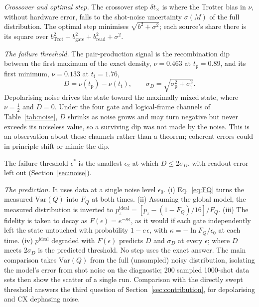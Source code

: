 \emph{Crossover and optimal step.} The crossover step $\delta t_\times$ is where
the Trotter bias in $\nu$, without hardware error, falls to the shot-noise
uncertainty $\sigma(M)$ of the full distribution. The optimal step minimises
$\sqrt{b^2 + \sigma^2}$; each source's share there is its square over
$b_{\mathrm{Trot}}^2 + b_{\mathrm{gate}}^2 + b_{\mathrm{read}}^2 + \sigma^2$.

\emph{The failure threshold.} The pair-production signal is the
recombination dip between the first
maximum of the exact density, $\nu = 0.463$ at $t_{\mathrm{p}} = 0.89$, and its
first minimum, $\nu = 0.133$ at $t_{\mathrm{t}} = 1.76$,
\begin{equation}
  \label{eq:dip}
  D = \nu(t_{\mathrm{p}}) - \nu(t_{\mathrm{t}}),
  \qquad
  \sigma_D = \sqrt{\sigma_{\mathrm{p}}^2 + \sigma_{\mathrm{t}}^2}.
\end{equation}
Depolarising noise drives the state toward the maximally mixed state, where
$\nu = \tfrac12$ and $D = 0$. Under the four gate and logical-frame channels of
Table~\ref{tab:noise}, $D$ shrinks as noise grows and may turn negative but
never exceeds its noiseless value, so a surviving dip was not made by the
noise. This is an observation about these channels rather than a theorem;
coherent errors could in principle shift or mimic the dip.

The failure threshold $\epsilon^\ast$ is the smallest $\epsilon_2$ at which
$D \le 2\sigma_D$, with readout error left out
(Section~\ref{sec:noise}).

\emph{The prediction.} It uses data at a single noise level $\epsilon_0$. (i)
Eq.~\eqref{eq:FQ} turns the measured $\mathrm{Var}(Q)$ into $F_Q$ at both
times. (ii) Assuming the global model,
the measured distribution is inverted to
$p^{\mathrm{ideal}}_z = [p_z - (1-F_Q)/16]/F_Q$. (iii) The fidelity is taken
to decay as $F(\epsilon) = e^{-\kappa\epsilon}$, as it would if each gate
independently left the state untouched with probability $1 - c\,\epsilon$, with
$\kappa = -\ln F_Q/\epsilon_0$ at each time. (iv) $p^{\mathrm{ideal}}$
degraded with $F(\epsilon)$ predicts $D$ and $\sigma_D$ at every
$\epsilon$; where $D$ meets $2\sigma_D$ is the predicted threshold. No step
uses the exact answer. The main comparison takes $\mathrm{Var}(Q)$ from the
full (unsampled) noisy distribution, isolating the model's error from shot
noise on the diagnostic; 200 sampled 1000-shot data sets then show the scatter
of a single run. Comparison with the directly swept threshold answers the
third question of Section~\ref{sec:contribution}, for depolarising and CX
dephasing noise.

